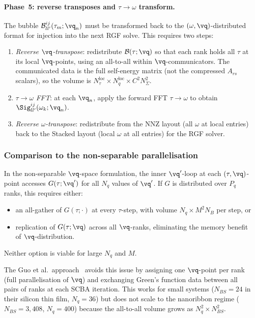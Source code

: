 \paragraph{Phase~5: reverse transposes and $\tau\to\omega$
  transform.}
%
The bubble $\mathcal{B}^{ij}_{ll'}(\tau_m;\vq_n)$ must be
transformed back to the $(\omega,\vq)$-distributed format for
injection into the next RGF solve.  This requires two steps:

\begin{enumerate}
\item \emph{Reverse $\vq$-transpose}: redistribute
  $\mathcal{B}(\tau;\vq)$ so that each rank holds all $\tau$
  at its local $\vq$-points, using an all-to-all within
  $\vq$-communicators.  The communicated data is the full
  self-energy matrix (not the compressed $A_{rs}$ scalars),
  so the volume is
  $N_\tau^{\mathrm{loc}} \times N_q^{\mathrm{loc}} \times
    C^2 N_\Sigma^2$.
\item \emph{$\tau\to\omega$ FFT}: at each $\vq_n$, apply the
  forward FFT $\tau\to\omega$ to obtain
  $\Sig^{ij}_{ll'}(\omega_k;\vq_n)$.
\item \emph{Reverse $\omega$-transpose}: redistribute from the
  NNZ layout (all $\omega$ at local entries) back to the
  Stacked layout (local $\omega$ at all entries) for the RGF
  solver.
\end{enumerate}

\subsubsection{Comparison to the non-separable parallelisation}
\label{sssub:compare_dist}

In the non-separable $\vq$-space formulation, the inner
$\vq'$-loop at each $(\tau,\vq)$-point accesses $G(\tau;\vq')$
for all $N_q$ values of $\vq'$.  If $G$ is distributed over
$P_q$ ranks, this requires either:
\begin{itemize}
\item an all-gather of $G(\tau;\cdot)$ at every $\tau$-step,
  with volume $N_q \times M^2 N_B$ per step, or
\item replication of $G(\tau;\vq)$ across all $\vq$-ranks,
  eliminating the memory benefit of $\vq$-distribution.
\end{itemize}
Neither option is viable for large $N_q$ and $M$.

The Guo et al.\ approach~\cite{guo2020} avoids this issue by
assigning one $\vq$-point per rank (full parallelisation of
$\vq$) and exchanging Green's function data between all pairs
of ranks at each SCBA iteration.  This works for small systems
($N_{BS} = 24$ in their silicon thin film, $N_q = 36$) but does
not scale to the nanoribbon regime ($N_{BS} = 3{,}408$,
$N_q = 400$) because the all-to-all volume grows as
$N_q^2 \times N_{BS}^2$.

